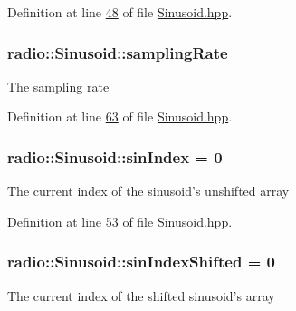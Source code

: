 Definition at line \hyperlink{Sinusoid_8hpp_source_l00048}{48} of file \hyperlink{Sinusoid_8hpp_source}{Sinusoid.\+hpp}.

\hypertarget{classradio_1_1Sinusoid_a964d64aae9acc4ea5d752534a33d76b8}{
\subsubsection[{sampling\+Rate}]{ radio\+::\+Sinusoid\+::sampling\+Rate\hspace{0.3cm}{\ttfamily [protected]}}}\label{classradio_1_1Sinusoid_a964d64aae9acc4ea5d752534a33d76b8}
The sampling rate 

Definition at line \hyperlink{Sinusoid_8hpp_source_l00063}{63} of file \hyperlink{Sinusoid_8hpp_source}{Sinusoid.\+hpp}.

\hypertarget{classradio_1_1Sinusoid_a2e7d029c5e7307967c77959367cc0224}{
\subsubsection[{sin\+Index}]{ radio\+::\+Sinusoid\+::sin\+Index = 0\hspace{0.3cm}{\ttfamily [protected]}}}\label{classradio_1_1Sinusoid_a2e7d029c5e7307967c77959367cc0224}
The current index of the sinusoid's unshifted array 

Definition at line \hyperlink{Sinusoid_8hpp_source_l00053}{53} of file \hyperlink{Sinusoid_8hpp_source}{Sinusoid.\+hpp}.

\hypertarget{classradio_1_1Sinusoid_a4acf2add824249c39046fe87f9a64f93}{
\subsubsection[{sin\+Index\+Shifted}]{ radio\+::\+Sinusoid\+::sin\+Index\+Shifted = 0\hspace{0.3cm}{\ttfamily [protected]}}}\label{classradio_1_1Sinusoid_a4acf2add824249c39046fe87f9a64f93}
The current index of the shifted sinusoid's array 

